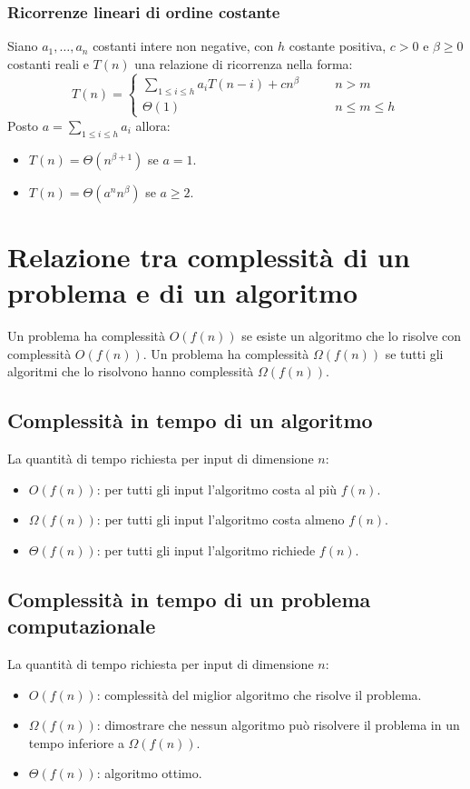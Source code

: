 \subsubsection{Ricorrenze lineari di ordine costante}
Siano $a_1,\dots,a_n$ costanti intere non negative, con $h$ costante positiva, $c>0$ e $\beta\ge 0$ costanti reali e $T(n)$ una relazione di ricorrenza 
nella forma:
\begin{equation*}
T(n)=
\begin{cases}
\sum\limits_{1\le i\le h}a_iT(n-i)+cn^\beta\quad\quad& n>m\\
\Theta(1) & n\le m\le h
\end{cases}
\end{equation*}
Posto $a=\sum\limits_{1\le i\le h}a_i$ allora:
\begin{itemize}
\item $T(n)=\Theta(n^{\beta+1})$ se $a=1$.
\item $T(n)=\Theta(a^nn^{\beta})$ se $a\ge 2$.
\end{itemize}




\section{Relazione tra complessit\`a di un problema e di un algoritmo}
Un problema ha complessit\`a $O(f(n))$ se esiste un algoritmo che lo risolve con complessit\`a $O(f(n))$. Un problema ha complessit\`a $\Omega(f(n))$ se
tutti gli algoritmi che lo risolvono hanno complessit\`a $\Omega(f(n))$.
\subsection{Complessit\`a in tempo di un algoritmo}
La quantit\`a di tempo richiesta per input di dimensione $n$:
\begin{itemize}
\item $O(f(n))$: per tutti gli input l'algoritmo costa al pi\`u $f(n)$.
\item $\Omega(f(n))$: per tutti gli input l'algoritmo costa almeno $f(n)$.
\item $\Theta(f(n))$: per tutti gli input l'algoritmo richiede $f(n)$.
\end{itemize}
\subsection{Complessit\`a in tempo di un problema computazionale}
La quantit\`a di tempo richiesta per input di dimensione $n$:
\begin{itemize}
\item $O(f(n))$: complessit\`a del miglior algoritmo che risolve il problema.
\item $\Omega(f(n))$: dimostrare che nessun algoritmo pu\`o risolvere il problema in un tempo inferiore a $\Omega(f(n))$.
\item $\Theta(f(n))$: algoritmo ottimo.
\end{itemize}
